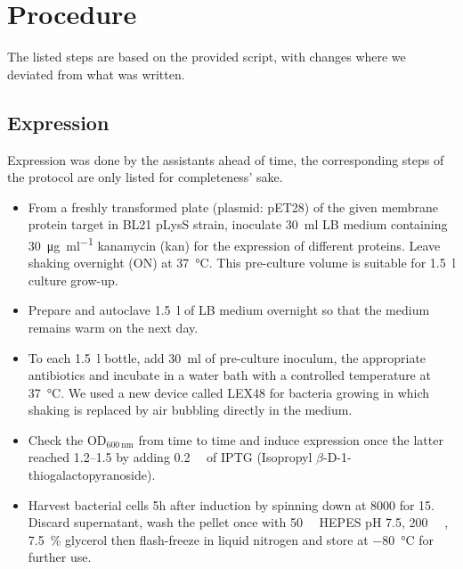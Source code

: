 \documentclass[a4paper]{scrreprt}
\title{\mytitle{}}
\author{Michael Senn \maillink{michael.senn@students.unibe.ch} - 16-126-880}
\date{\printdate}
\begin{document}
\maketitle

\chapter{Procedure\cite{skript_ballmoos}}

The listed steps are based on the provided script, with changes where we
deviated from what was written.

\section{Expression}

Expression was done by the assistants ahead of time, the corresponding steps of
the protocol are only listed for completeness' sake.

\begin{itemize}
	\item From a freshly transformed plate (plasmid: pET28) of the given
		membrane protein target in BL21 pLysS strain, inoculate
		\SI{30}{\ml} LB medium containing \SI{30}{\ug \per \ml}
		kanamycin (kan) for the expression of different proteins. Leave
		shaking overnight (ON) at \SI{37}{\celsius}. This pre-culture
		volume is suitable for \SI{1.5}{\l} culture grow-up.

	\item Prepare and autoclave \SI{1.5}{\l} of LB medium overnight so that
		the medium remains warm on the next day.

	\item To each \SI{1.5}{\l} bottle, add \SI{30}{\ml} of pre-culture
		inoculum, the appropriate antibiotics and incubate in a water
		bath with a controlled temperature at \SI{37}{\celsius}. We
		used a new device called LEX48 for bacteria growing in which
		shaking is replaced by air bubbling directly in the medium.

	\item Check the OD$_{\SI{600}{\nm}}$ from time to time and induce
		expression once the latter reached \numrange{1.2}{1.5} by adding
		\SI{0.2}{\milli\Molar} of IPTG (Isopropyl
		$\beta$-D-1-thiogalactopyranoside).

	\item Harvest bacterial cells 5h after induction by spinning down at
		\SI{8000}{\rpm} for \SI{15}{\min}. Discard supernatant, wash
		the pellet once with \SI{50}{\milli\Molar} HEPES pH 7.5,
		\SI{200}{\milli\Molar} , \SI{7.5}{\percent} glycerol
		then flash-freeze in liquid nitrogen and store at
		\SI{-80}{\celsius} for further use.
\end{itemize}
\end{document}
